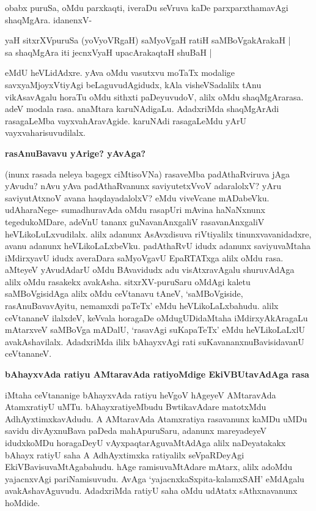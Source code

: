 \noindent
obabx puruSa, oMdu parxkaqti, iveraDu seVruva kaDe parxparxthamavAgi shaqMgAra. idanenxV-

\begin{shloka}
yaH sitxrXVpuruSa (yoVyoVRgaH) saMyoVgaH ratiH saMBoVgakArakaH |\\\label{227a}
sa shaqMgAra iti jecnxVyaH upacArakaqtaH shuBaH |
\end{shloka}

\noindent
eMdU heVLidAdxre. yAva oMdu vasutxvu moTaTx modalige savxyaMjoyxVtiyAgi beLaguvudAgidudx, kAla visheVSadalilx tAnu vikAsavAgalu horaTu oMdu sithxti paDeyuvudoV, alilx oMdu shaqMgArarasa. adeV modala rasa. anaMtara karuNAdigaLu. AdadxriMda shaqMgArAdi rasagaLeMba vayxvahAravAgide. karuNAdi rasagaLeMdu yArU vayxvaharisuvudilalx.

\eject

{\bigskip
\noindent
{\large\bf rasAnuBavavu yArige? yAvAga?}}\label{page227a}
\medskip

\noindent
(inunx rasada neleya bagegx ciMtisoVNa) rasaveMba padAthaRviruva jAga yAvudu? nAvu yAva padAthaRvanunx saviyutetxVvoV adaralolxV? yAru saviyutAtxnoV avana haqdayadalolxV? eMdu viveVcane mADabeVku. udAharaNege- sumadhuravAda oMdu rasapUri mAvina haNaNxnunx tegedukoMDare, adeVnU tananx guNavanAnxgaliV rasavanAnxgaliV heVLikoLuLxvudilalx. alilx adanunx AsAvxdisuva riVtiyalilx tinunxvavanidadxre, avanu adanunx heVLikoLaLxbeVku. padAthaRvU idudx adanunx saviyuvaMtaha iMdirxyavU idudx averaDara saMyoVgavU EpaRTATxga alilx oMdu rasa. aMteyeV yAvudAdarU oMdu BAvavidudx adu visAtxravAgalu shuruvAdAga alilx oMdu rasakekx avakAsha. sitxrXV-puruSaru oMdAgi kaletu saMBoVgisidAga alilx oMdu ceVtanavu tAneV, `saMBoVgiside, rasAnuBavavAyitu, nemamxdi paTeTx' eMdu heVLikoLaLxbahudu. alilx ceVtananeV ilalxdeV, keVvala horagaDe oMdugUDidaMtaha iMdirxyAkAragaLu mAtarxveV saMBoVga mADalU, `rasavAgi suKapaTeTx' eMdu heVLikoLaLxlU avakAshavilalx. AdadxriMda ililx bAhayxvAgi rati suKavananxnuBavisidavanU ceVtananeV.

{\bigskip
\noindent
{\large\bf bAhayxvAda ratiyu AMtaravAda ratiyoMdige EkiVBUtavAdAga rasa}}\label{page228}
\medskip

\noindent
iMtaha ceVtananige bAhayxvAda ratiyu heVgoV hAgeyeV AMtaravAda AtamxratiyU uMTu. bAhayxratiyeMbudu BwtikavAdare matotxMdu AdhAyxtimxkavAdudu. A AMtaravAda Atamxratiya rasavanunx kaMDu uMDu savidu divAyxnuBava paDeda mahApuruSaru, adanunx mareyadeyeV idudxkoMDu horagaDeyU vAyxpaqtarAguvaMtAdAga alilx naDeyatakakx bAhayx ratiyU saha A AdhAyxtimxka ratiyalilx seVpaRDeyAgi EkiVBavisuvaMtAgabahudu. hAge ramisuvaMtAdare mAtarx, alilx adoMdu yajacnxvAgi pariNamisuvudu. AvAga `yajacnxkaSxpita-kalamxSAH'\label{228} eMdAgalu avakAshavAguvudu. AdadxriMda ratiyU saha oMdu udAtatx sAthxnavanunx hoMdide.

